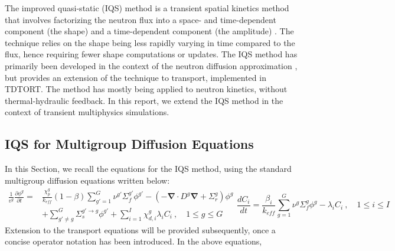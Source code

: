 \documentclass[12pt]{scrartcl}
\renewcommand{\div}{\bs{\nabla}\! \cdot \!}
\newcommand{\grad}{\bs{\nabla}}
\newcommand{\bs}[1]{\mathbf{#1}}
\newcommand{\keff}{k_\textit{eff}}
\newcommand{\be}{\begin{equation}}
\newcommand{\ee}{\end{equation}}
\begin{document}
\par
The improved quasi-static (IQS) method is a transient spatial kinetics method that involves factorizing the neutron flux into a space- and time-dependent component (the shape) and a time-dependent component (the amplitude) \cite{Ott_1966,Dulla2008}. The technique relies on the shape being less rapidly varying in time compared to the flux, hence requiring fewer shape computations or updates. The IQS method has primarily been developed in the context of the neutron diffusion approximation \cite{Ban_2012,Ferguson_1973}, but \cite{Devooght_1980} provides an extension of the technique to transport, implemented in TDTORT. The method has mostly being applied to neutron kinetics, without thermal-hydraulic feedback. In this report, we extend the IQS method in the context of transient multiphysics simulations.


\subsection{IQS for Multigroup Diffusion Equations}

In this Section, we recall the equations for the IQS method, using the standard multigroup diffusion equations written below:
\begin{subequations}
\begin{align}
\frac{1}{v^g} \frac{\partial \phi^g }{\partial t} =& \frac{\chi_p^g}{\keff} (1-\beta)\sum_{g'=1}^G  \nu^{g'} \Sigma_f^{g'} \phi^{g'} -  \left( -\div D^g \grad  + \Sigma_r^g \right) \phi^g  \nonumber \\
&  + \sum_{g'\neq g}^G\Sigma_s^{g'\to g} \phi^{g'}  + \sum_{i=1}^I\chi_{d,i}^g\lambda_i C_i \ , \quad 1 \le g \le G 
\label{eq:flux}
\end{align}
\be
\frac{dC_i}{dt} = \frac{\beta_i}{\keff}\sum_{g=1}^G\nu^{g} \Sigma_f^g \phi^{g} - \lambda_i C_i \ , \quad 1 \le i \le I 
\label{eq:precursor}
\ee
\end{subequations}
%
Extension to the transport equations will be provided subsequently, once a concise operator notation has been introduced. 
In the above equations,  \\
\end{document}
